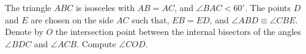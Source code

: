 The triangle $ABC$ is isosceles with $AB=AC$, and $\angle{BAC} < 60^{\circ}$.
The points $D$ and $E$ are chosen on the side $AC$ such that, $EB=ED$, and $\angle{ABD} \equiv \angle{CBE}$.
Denote by $O$ the intersection point between the internal bisectors of the angles $\angle{BDC}$ and $\angle{ACB}$.
Compute $\angle{COD}$.
